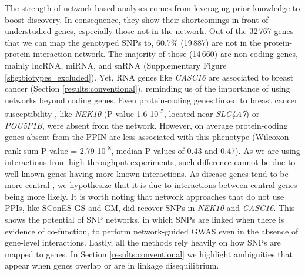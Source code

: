 \documentclass[twocolumn, 11pt, draft]{article}
\begin{document}
The strength of network-based analyses comes from leveraging prior knowledge to boost discovery. In consequence, they show their shortcomings in front of understudied genes, especially those not in the network. Out of the 32\,767 genes that we can map the genotyped SNPs to, 60.7\% (19\,887) are not in the protein-protein interaction network. The majority of those (14\,660) are non-coding genes, mainly lncRNA, miRNA, and snRNA (Supplementary Figure \ref{sfig:biotypes_excluded}). Yet, RNA genes like \emph{CASC16} are associated to breast cancer (Section \ref{results:conventional}), reminding us of the importance of using networks beyond coding genes. Even protein-coding genes linked to breast cancer susceptibility \cite{ahmed_newly_2009}, like \emph{NEK10} (P-value 1.6 \texttimes{} 10\textsuperscript{-5}, located near \emph{SLC4A7}) or \emph{POU5F1B}, were absent from the network. However, on average protein-coding genes absent from the PPIN are less associated with this phenotype (Wilcoxon rank-sum P-value = 2.79 \texttimes{} 10\textsuperscript{-8}, median P-values of 0.43 and 0.47). As we are using interactions from high-throughput experiments, such difference cannot be due to well-known genes having more known interactions. As disease genes tend to be more central \cite{pinero_uncovering_2016}, we hypothesize that it is due to interactions between central genes being more likely. It is worth noting that network approaches that do not use PPIs, like SConES GS and GM, did recover SNPs in \emph{NEK10} and \emph{CASC16}. This shows the potential of SNP networks, in which SNPs are linked when there is evidence of co-function, to perform network-guided GWAS even in the absence of gene-level interactions. Lastly, all the methods rely heavily on how SNPs are mapped to genes. In Section \ref{results:conventional} we highlight ambiguities that appear when genes overlap or are in linkage disequilibrium.
\end{document}
